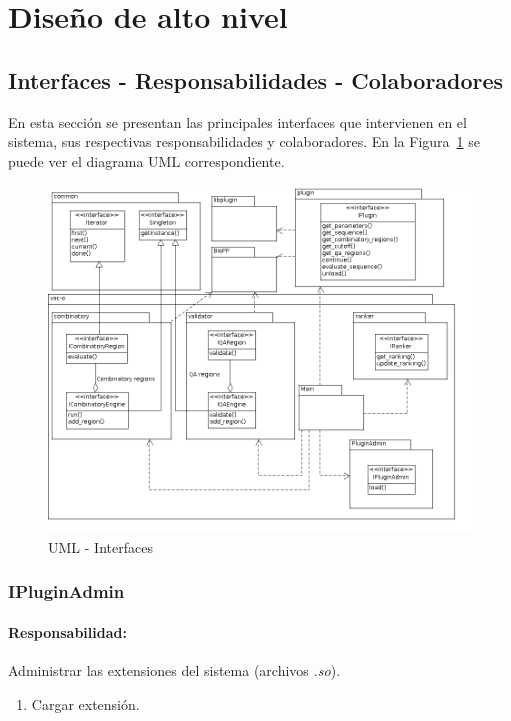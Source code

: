 \section{Dise\~no de alto nivel}
\label{hld}
\subsection{Interfaces - Responsabilidades - Colaboradores}
En esta secci\'on se presentan las principales interfaces que intervienen en el
sistema, sus respectivas responsabilidades y colaboradores. En la
Figura~\ref{uml:1} se puede ver el diagrama UML correspondiente.
\begin{figure}
  \centering
  \includegraphics[scale=0.5, angle=90]{hld.png}  
  \caption{UML - Interfaces}
  \label{uml:1}
\end{figure}

  \subsubsection{IPluginAdmin}
    \paragraph{Responsabilidad:} Administrar las extensiones del sistema
(archivos \textit{.so}).    
      \begin{enumerate}
       \item Cargar extensi\'on.       
      \end{enumerate}    

